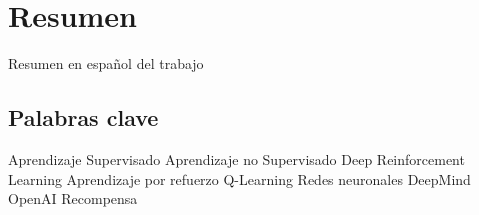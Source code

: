 \chapter*{Resumen}

Resumen en español del trabajo


\section*{Palabras clave}
   
\noindent Aprendizaje Supervisado
\noindent Aprendizaje no Supervisado
\noindent Deep Reinforcement Learning
\noindent Aprendizaje por refuerzo
\noindent Q-Learning
\noindent Redes neuronales
\noindent DeepMind 
\noindent OpenAI
\noindent Recompensa
